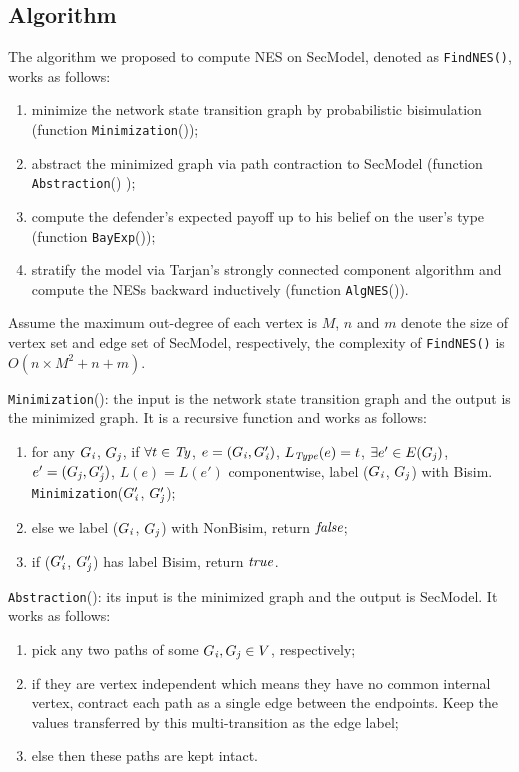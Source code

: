 \documentclass[10pt, conference, compsocconf]{IEEEtran}
\begin{document}
\subsection{Algorithm}
The algorithm we proposed to compute NES on SecModel, denoted as \verb"FindNES()", works as follows:
\begin{enumerate}[1]
\item minimize the network state transition graph by probabilistic bisimulation (function \verb"Minimization"());
\item abstract the minimized graph via path contraction to SecModel (function \verb"Abstraction"() );
\item compute the defender's expected payoff up to his belief on the user's type (function \verb"BayExp"());
\item stratify the model via Tarjan's strongly connected component algorithm \cite{reinhard} and compute the NESs backward inductively (function \verb"AlgNES"()).
\end{enumerate}

Assume the maximum out-degree of each vertex is $M$, $n$ and $m$ denote the size of vertex set and edge set of SecModel, respectively, the complexity of \verb"FindNES()" is $O(n\times M^2+n+m)$.

\verb"Minimization"():
the input is the network state transition graph and the output is the minimized graph. It is a recursive function and works as follows:
\begin{enumerate}[1]
\item for any $G_{\it i}$, $G_{\it j}$, if $\forall t\in {\it Ty}$, $e=(G_{\it i},G_{\it i}')$, $L_{\it Type}(e)=t$, $\exists e'\in E(G_{\it j})$,  $e'=(G_{\it j},G_{\it j}')$, $L(e)=L(e')$ componentwise, label ($G_{\it i}$, $G_{\it j}$) with {\rm Bisim}. \verb"Minimization"($G_{\it i}'$, $G_{\it j}'$);
\item else we label ($G_{\it i}$, $G_{\it j}$) with {\rm NonBisim}, return ${\it false}$;
\item if ($G_{\it i}'$, $G_{\it j}'$) has label {\rm Bisim}, return ${\it true}$.
\end{enumerate}

\verb"Abstraction"():
its input is the minimized graph and the output is SecModel. It works as follows:
\begin{enumerate}[1]
\item pick any two paths of some $G_{\it i},G_{\it j}\in V$, respectively;
\item if they are vertex independent which means they have no common internal vertex, contract each path as a single edge between the endpoints.
    Keep the values transferred by this multi-transition as the edge label;
\item else then these paths are kept intact.
\end{enumerate}
\end{document}
